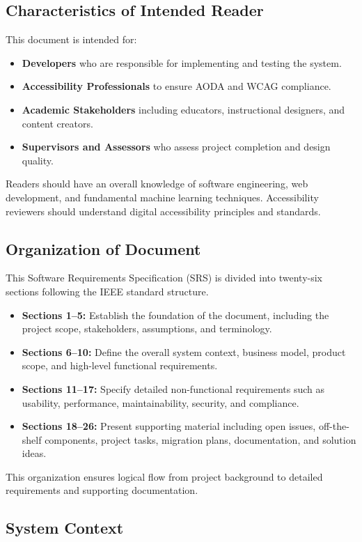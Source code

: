 \documentclass[12pt]{article}
\begin{document}
\subsection{Characteristics of Intended Reader}
This document is intended for:
\begin{itemize}
  \item \textbf{Developers} who are responsible for implementing and
    testing the system.
  \item \textbf{Accessibility Professionals} to ensure AODA and WCAG compliance.
  \item \textbf{Academic Stakeholders} including educators,
    instructional designers, and content creators.
  \item \textbf{Supervisors and Assessors} who assess project
    completion and design quality.
\end{itemize}

Readers should have an overall knowledge of software engineering, web
development, and fundamental machine learning techniques.
Accessibility reviewers should understand digital accessibility
principles and standards.

\subsection{Organization of Document}
This Software Requirements Specification (SRS) is divided into
twenty-six sections following the IEEE standard structure.
\begin{itemize}
  \item \textbf{Sections 1–5:} Establish the foundation of the
    document, including the project scope, stakeholders, assumptions,
    and terminology.
  \item \textbf{Sections 6–10:} Define the overall system context,
    business model, product scope, and high-level functional requirements.
  \item \textbf{Sections 11–17:} Specify detailed non-functional
    requirements such as usability, performance, maintainability,
    security, and compliance.
  \item \textbf{Sections 18–26:} Present supporting material
    including open issues, off-the-shelf components, project tasks,
    migration plans, documentation, and solution ideas.
\end{itemize}
This organization ensures logical flow from project background to
detailed requirements and supporting documentation.

\subsection{System Context}
\end{document}
